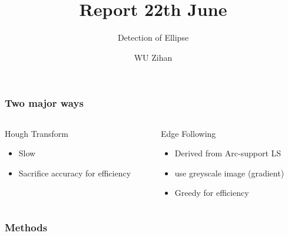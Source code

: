 \documentclass{beamer}
\title{Report 22th June}
\author{WU Zihan}
\subtitle{Detection of Ellipse}
\begin{document}
    \maketitle
    \begin{frame}
        \frametitle{Two major ways}
        
        \begin{columns}
            \begin{column}{.5\linewidth}
                Hough Transform
                \begin{itemize}
                    \item Slow
                    \item Sacrifice accuracy for efficiency
                \end{itemize}
            \end{column}
            \begin{column}{.5\linewidth}
                Edge Following
                \begin{itemize}
                    \item Derived from Arc-support LS 
                    \item use greyscale image (gradient)
                    \item Greedy for efficiency
                \end{itemize}
            \end{column}
        \end{columns}
        
    \end{frame}

    \begin{frame}
        \frametitle{Methods}
    
        
    
    \end{frame}
\end{document}
